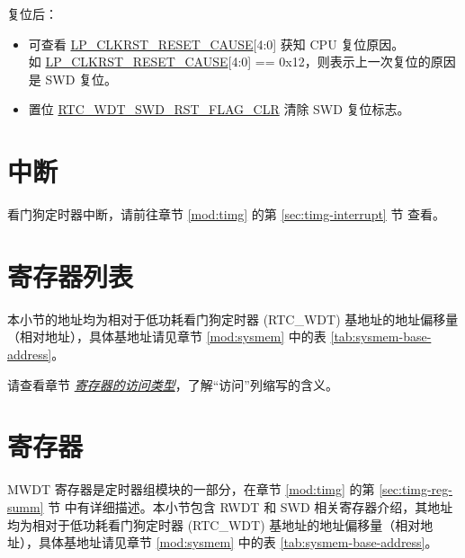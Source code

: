 \documentclass[main\_\_CN.tex]{subfiles}
\begin{document}
复位后：
\begin{itemize}
    \item 可查看 \hyperref[fielddesc:LPCLKRSTRESETCAUSE]{LP\_CLKRST\_RESET\_CAUSE}[4:0] 获知 CPU 复位原因。\\
	如 \hyperref[fielddesc:LPCLKRSTRESETCAUSE]{LP\_CLKRST\_RESET\_CAUSE}[4:0] == 0x12，则表示上一次复位的原因是 SWD 复位。
	\item 置位 \hyperref[fielddesc:RTCWDTSWDRSTFLAGCLR]{RTC\_WDT\_SWD\_RST\_FLAG\_CLR} 清除 SWD 复位标志。
\end{itemize}

\section{中断}

看门狗定时器中断，请前往章节 \ref{mod:timg} \textit{} 的第 \ref{sec:timg-interrupt} 节 \textit{} 查看。



\section{寄存器列表}\label{sec:wdt-reg-summ}

本小节的地址均为相对于低功耗看门狗定时器 (RTC\_WDT) 基地址的地址偏移量（相对地址），具体基地址请见章节 \ref{mod:sysmem} \textit{} 中的表 \ref{tab:sysmem-base-address}。

请查看章节 \hyperref[glossary-access-types]{\textit{寄存器的访问类型}}，了解“访问”列缩写的含义。




\section{寄存器}

MWDT 寄存器是定时器组模块的一部分，在章节 \ref{mod:timg} \textit{} 的第 \ref{sec:timg-reg-summ} 节 \textit{} 中有详细描述。本小节包含 RWDT 和 SWD 相关寄存器介绍，其地址均为相对于低功耗看门狗定时器 (RTC\_WDT) 基地址的地址偏移量（相对地址），具体基地址请见章节 \ref{mod:sysmem} \textit{} 中的表 \ref{tab:sysmem-base-address}。


\end{document}
